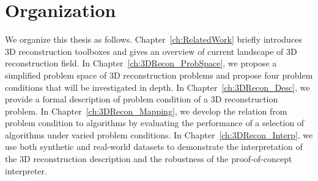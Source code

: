 



\section{Organization}
We organize this thesis as follows. Chapter~\ref{ch:RelatedWork} briefly introduces 3D reconstruction toolboxes and gives an overview of current landscape of 3D reconstruction field. In Chapter~\ref{ch:3DRecon_ProbSpace}, we propose a simplified problem space of 3D reconstruction problems and propose four problem conditions that will be investigated in depth. In Chapter~\ref{ch:3DRecon_Desc}, we provide a formal description of problem condition of a 3D reconstruction problem. In Chapter~\ref{ch:3DRecon_Mapping}, we develop the relation from problem condition to algorithms by evaluating the performance of a selection of algorithms under varied problem conditions. In Chapter~\ref{ch:3DRecon_Interp}, we use both synthetic and real-world datasets to demonstrate the interpretation of the 3D reconstruction description and the robustness of the proof-of-concept interpreter.
